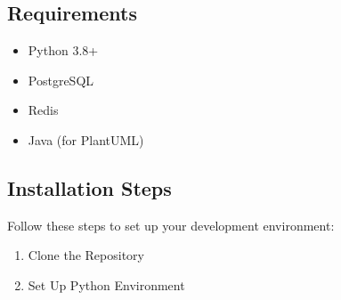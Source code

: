 \documentclass[letterpaper,10pt,english]{sphinxmanual}
\begin{document}
\subsection{Requirements}
\label{\detokenize{getting_started/index:requirements}}\begin{itemize}
\item {} 
\sphinxAtStartPar
Python 3.8+

\item {} 
\sphinxAtStartPar
PostgreSQL

\item {} 
\sphinxAtStartPar
Redis

\item {} 
\sphinxAtStartPar
Java (for PlantUML)

\end{itemize}


\subsection{Installation Steps}
\label{\detokenize{getting_started/index:installation-steps}}
\sphinxAtStartPar
Follow these steps to set up your development environment:
\begin{enumerate}
%
\item {} 
\sphinxAtStartPar
Clone the Repository

\begin{sphinxVerbatim}[commandchars=\\\{\}]
  
\end{sphinxVerbatim}

\item {} 
\sphinxAtStartPar
Set Up Python Environment

\begin{sphinxVerbatim}[commandchars=\\\{\}]
   

\PYGZbs{}\PYGZbs{}

 

   
\end{sphinxVerbatim}

\end{enumerate}
\end{document}
